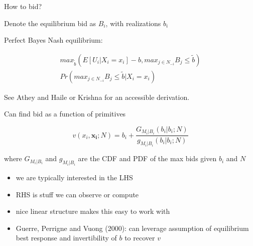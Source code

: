 \begin{frame}{How to bid?}

Denote the equilibrium bid as $B_i$, with realizations $b_i$

\vspace{10pt}

Perfect Bayes Nash equilibrium:
\vspace{-10pt}

\begin{multline*} 
  max_{\tilde b}  \left( E \left[ U_i | X_i = x_i \right] - b , max_{j \in N_{-i}} B_j \leq \tilde b \right) \\ Pr \left( max_{j \in N_{-i}} B_j \leq \tilde b | X_i = x_i \right) 
\end{multline*}

See Athey and Haile or Krishna for an accessible derivation. 

\end{frame}  

\begin{frame}{Can find bid as a function of primitives}

  $$ v(x_i,\mathbf{x_i};N) = b_i + \frac{G_{M_i | B_i} \left(b_i | b_i ; N \right)}{ g_{M_i | B_i} \left(b_i | b_i ; N \right)} $$

  where $G_{M_i | B_i}$ and $g_{M_i | B_i}$ are the CDF and PDF of the max bids given $b_i$ and $N$ 

  \begin{itemize}
    \item we are typically interested in the LHS
    \item RHS is stuff we can observe or compute
    \item nice linear structure makes this easy to work with
    \item Guerre, Perrigne and Vuong (2000): can leverage assumption of equilibrium best response and invertibility of $b$ to recover $v$
  \end{itemize}

\end{frame}  

